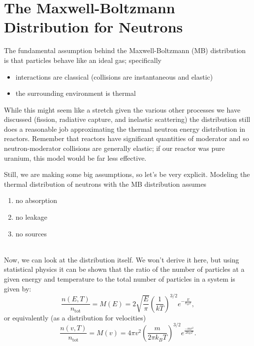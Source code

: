 \documentclass{report}
\begin{document}
\newpage
\section*{The Maxwell-Boltzmann Distribution for Neutrons} 

The fundamental assumption behind the Maxwell-Boltzmann (MB) distribution is that particles behave like an ideal gas; specifically
\begin{itemize}
\item interactions are classical (collisions are instantaneous and elastic)
\item the surrounding environment is thermal
\end{itemize}
While this might seem like a stretch given the various other processes we have discussed (fission, radiative capture, and inelastic scattering) the distribution still does a reasonable job approximating the thermal neutron energy distribution in reactors.
Remember that reactors have significant quantities of moderator and so neutron-moderator collisions are generally elastic; if our reactor was pure uranium, this model would be far less effective.

Still, we are making some big assumptions, so let's be very explicit.
Modeling the thermal distribution of neutrons with the MB distribution assumes
\begin{enumerate}
\item no absorption
\item no leakage
\item no sources
\end{enumerate}
\-\\
Now, we can look at the distribution itself.
We won't derive it here, but using statistical physics it can be shown that the ratio of the number of particles at a given energy and temperature to the total number of particles in a system is given by:
\begin{equation}
\frac{n\left(E, T\right)}{n_{\text{tot}}} = M(E) = 2\sqrt{\frac{E}{\pi}}\left(\frac{1}{kT}\right)^{3/2} e^{-\frac{E}{k_B T}} ,
\label{mb-energy}
\end{equation}
or equivalently (as a distribution for velocities)
\begin{equation}
\frac{n\left(v, T\right)}{n_{\text{tot}}} = M(v) = 4 \pi v^2 \left(\frac{m}{2 \pi k_B T} \right)^{3/2} e^{\frac{-m v^2}{2 k_B T}} .
\label{mb-velocity}
\end{equation}
\end{document}
